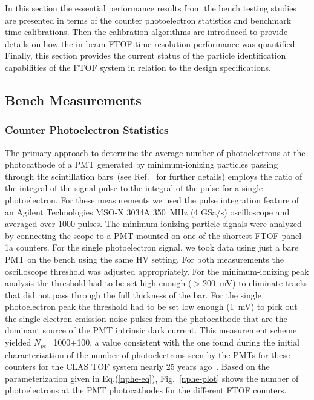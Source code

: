\documentclass{elsart}
\begin{document}
In this section the essential performance results from the bench testing studies are presented in terms
of the counter photoelectron statistics and benchmark time calibrations. Then the calibration algorithms
are introduced to provide details on how the in-beam FTOF time resolution performance was quantified.
Finally, this section provides the current status of the particle identification capabilities of the FTOF
system in relation to the design specifications.

\subsection{Bench Measurements}

\subsubsection{Counter Photoelectron Statistics}
\label{sec:npe}

The primary approach to determine the average number of photoelectrons at the photocathode of a PMT
generated by minimum-ionizing particles passing through the scintillation bars~(see Ref.~\cite{Gi86} for
further details) employs the ratio of the integral of the signal pulse to the integral of the pulse for a single
photoelectron. For these measurements we used the pulse integration feature of an Agilent Technologies
MSO-X 3034A 350~MHz (4 GSa/s) oscilloscope and averaged over 1000 pulses. The minimum-ionizing
particle signals were analyzed by connecting the scope to a PMT mounted on one of the shortest FTOF
panel-1a counters. For the single photoelectron signal, we took data using just a bare PMT on the bench
using the same HV setting. For both measurements the oscilloscope threshold was adjusted appropriately.
For the minimum-ionizing peak analysis the threshold had to be set high enough ($>$200~mV) to eliminate
tracks that did not pass through the full thickness of the bar. For the single photoelectron peak the
threshold had to be set low enough (1~mV) to pick out the single-electron emission noise pulses from the 
photocathode that are the dominant source of the PMT intrinsic dark current. This measurement scheme
yielded $N_{pe}$=1000$\pm$100, a value consistent with the one found during the initial characterization
of the number of photoelectrons seen by the PMTs for these counters for the CLAS TOF system nearly
25 years ago~\cite{tof-nim}. Based on the parameterization given in Eq.(\ref{nphe-eq}), Fig.~\ref{nphe-plot}
shows the number of photoelectrons at the PMT photocathodes for the different FTOF counters.
\end{document}
